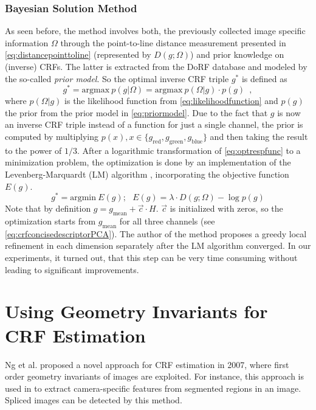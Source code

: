 \subsubsection{Bayesian Solution Method}
As seen before, the method involves both, the previously collected image specific information $\Omega$ through the point-to-line distance measurement presented in \autoref{eq:distancepointtoline} (represented by $D(g;\Omega)$) and prior knowledge on (inverse) CRFs. The latter is extracted from the DoRF database and modeled by the so-called \emph{prior model}. So the optimal inverse CRF triple $g^*$ is defined as
\begin{equation}
	g^* = \mathrm{argmax} \ p(g|\Omega) = \mathrm{argmax} \ p(\Omega|g) \cdot p(g) \enspace ,
	\label{eq:optrespfunc}
\end{equation}
where $p(\Omega|g)$ is the likelihood function from \autoref{eq:likelihoodfunction} and $p(g)$ the prior from the prior model in \autoref{eq:priormodel}. Due to the fact that $g$ is now an inverse CRF triple instead of a function for just a single channel, the prior is computed by multiplying $p(x), x \in \{g_{\text{red}}, g_{\text{green}}, g_{\text{blue}}\}$ and then taking the result to the power of $1/3$.
After a logarithmic transformation of \autoref{eq:optrespfunc} to a minimization problem, the optimization is done by an implementation of the Levenberg-Marquardt (LM) algorithm \cite{WWW:lmfit}, incorporating the objective function $E(g)$.
\begin{equation}
	g^* = \mathrm{argmin} \  E(g);\ \ \ E(g) = \lambda \cdot D(g;\Omega) - \log p(g)
	\label{eq:levmar}
\end{equation}
Note that by definition $g = g_{\text{mean}} + \vec{c} \cdot H$. $\vec{c}$ is initialized with zeros, so the optimization starts from $g_{\text{mean}}$ for all three channels (see \autoref{eq:crfconcisedescriptorPCA}). The author of the method proposes a greedy local refinement in each dimension separately after the LM algorithm converged. In our experiments, it turned out, that this step can be very time consuming without leading to significant improvements.






\clearpage


\section{Using Geometry Invariants for CRF Estimation}
\label{sec:geoinv}
Ng et \hbox{al.} proposed a novel approach for CRF estimation \cite{ng_cvpr07} in 2007, where first order geometry invariants of images are exploited. For instance, this approach is used in \cite{hsu2007image} to extract camera-specific features from segmented regions in an image. Spliced images can be detected by this method.

